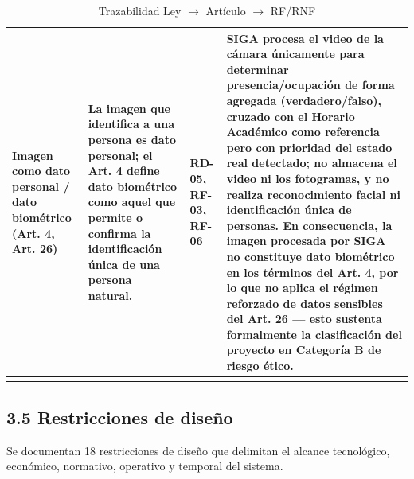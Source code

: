 \begin{longtable}{|P{0.2500}|P{0.2500}|P{0.2500}|P{0.2500}|}
Imagen como dato personal / dato biométrico (Art. 4, Art. 26) & La imagen que identifica a una persona es dato personal; el Art. 4 define dato biométrico como aquel que permite o confirma la identificación única de una persona natural. & RD-05, RF-03, RF-06 & SIGA procesa el video de la cámara únicamente para determinar presencia/ocupación de forma agregada (verdadero/falso), cruzado con el Horario Académico como referencia pero con prioridad del estado real detectado; no almacena el video ni los fotogramas, y no realiza reconocimiento facial ni identificación única de personas. En consecuencia, la imagen procesada por SIGA \textbf{no constituye dato biométrico} en los términos del Art. 4, por lo que no aplica el régimen reforzado de datos sensibles del Art. 26 --- esto sustenta formalmente la clasificación del proyecto en Categoría B de riesgo ético. \\ \hline
\caption{Trazabilidad Ley $\rightarrow$ Artículo $\rightarrow$ RF/RNF}
\end{longtable}
\endgroup

\subsection*{3.5 Restricciones de diseño}


Se documentan 18 restricciones de diseño que delimitan el alcance tecnológico, económico, normativo, operativo y temporal del sistema.


